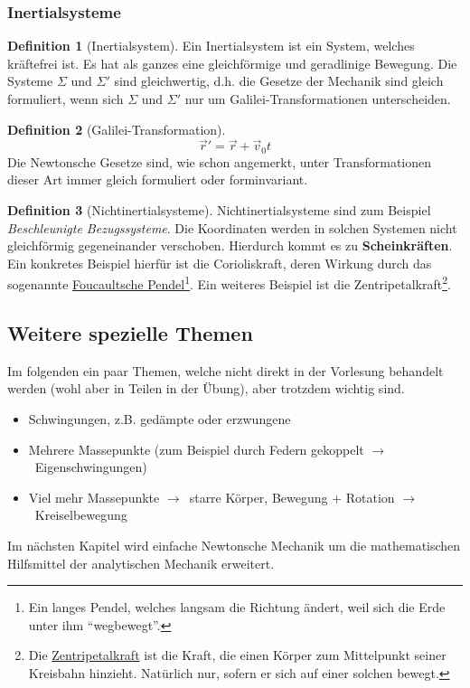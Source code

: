 \documentclass[oneside]{book}
\theoremstyle{definition}
\newtheorem*{definition*}{Definition}
\newcommand{\conseq}{$\rightarrow$~}
\begin{document}
\subsubsection{Inertialsysteme}
\begin{definition*}[Inertialsystem]
	Ein Inertialsystem ist ein System, welches kräftefrei ist. Es hat als ganzes eine gleichförmige und geradlinige Bewegung.
Die Systeme $\Sigma$ und $\Sigma'$ sind gleichwertig, d.h. die Gesetze der Mechanik sind gleich formuliert, wenn sich $\Sigma$ und $\Sigma'$ nur um Galilei-Transformationen unterscheiden.
\end{definition*}

\begin{definition*}[Galilei-Transformation]
$$ \vec{r}' = \vec{r} + \vec{v}_0t$$
Die Newtonsche Gesetze sind, wie schon angemerkt, unter Transformationen dieser Art immer gleich formuliert oder forminvariant.
\end{definition*}

\begin{definition*}[Nichtinertialsysteme]
	Nichtinertialsysteme sind zum Beispiel \textit{Beschleunigte Bezugssysteme}. Die Koordinaten werden in solchen Systemen nicht gleichförmig gegeneinander verschoben. Hierdurch kommt es zu \textbf{Scheinkräften}. Ein konkretes Beispiel hierfür ist die Corioliskraft, deren Wirkung durch das sogenannte \href{https://de.wikipedia.org/wiki/Foucaultsches_Pendel}{Foucaultsche Pendel}\footnote{Ein langes Pendel, welches langsam die Richtung ändert, weil sich die Erde unter ihm "`wegbewegt"'.}. Ein weiteres Beispiel ist die Zentripetalkraft\footnote{Die \href{http://de.wikipedia.org/wiki/Zentripetalkraft}{Zentripetalkraft} ist die Kraft, die einen Körper zum Mittelpunkt seiner Kreisbahn hinzieht. Natürlich nur, sofern er sich auf einer solchen bewegt.}.
\end{definition*}


\subsection{Weitere spezielle Themen}
Im folgenden ein paar Themen, welche nicht direkt in der Vorlesung behandelt werden (wohl aber in Teilen in der Übung), aber trotzdem wichtig sind.
\begin{itemize}
	\item Schwingungen, z.B. gedämpte oder erzwungene
	\item Mehrere Massepunkte (zum Beispiel durch Federn gekoppelt \conseq Eigenschwingungen) 
	\item Viel mehr Massepunkte \conseq starre Körper, Bewegung $+$ Rotation \conseq Kreiselbewegung
\end{itemize}
Im nächsten Kapitel wird einfache Newtonsche Mechanik um die mathematischen Hilfsmittel der analytischen Mechanik erweitert.
\end{document}

